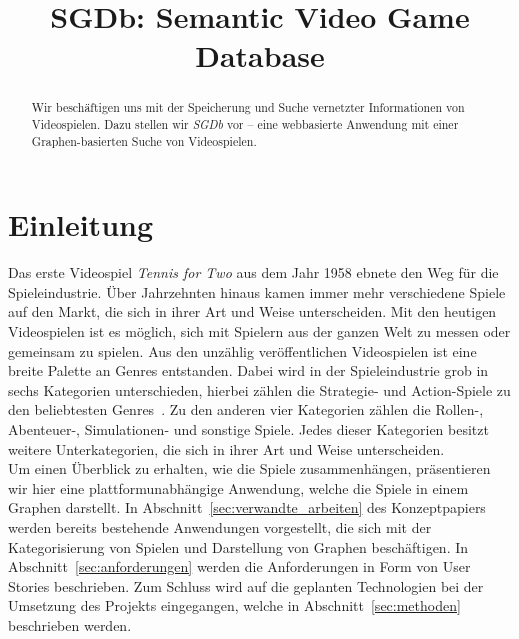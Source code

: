 \documentclass[a4paper, 10pt, conference]{IEEEtran}
\begin{document}
\title{\LARGE \bf
SGDb: Semantic Video Game Database
}

\author{
 \and
{} \and
{} \and
{} \and
{} \and
}

\maketitle
\thispagestyle{empty}
\pagestyle{empty}


\begin{abstract}
    Wir beschäftigen uns mit der Speicherung und Suche vernetzter Informationen von Videospielen.
    Dazu stellen wir \textit{SGDb} vor -- eine webbasierte Anwendung mit einer Graphen-basierten Suche von Videospielen.
\end{abstract}


\section{Einleitung}\label{sec:einleitung}

Das erste Videospiel \textit{Tennis for Two} aus dem Jahr 1958 ebnete den Weg für die Spieleindustrie. Über Jahrzehnten hinaus kamen immer mehr verschiedene Spiele auf den Markt, die sich in ihrer Art und Weise unterscheiden. Mit den heutigen Videospielen ist es möglich, sich mit Spielern aus der ganzen Welt zu messen oder gemeinsam zu spielen. Aus den unzählig veröffentlichen Videospielen ist eine breite Palette an Genres entstanden. Dabei wird in der Spieleindustrie grob in sechs Kategorien unterschieden, hierbei zählen die Strategie- und Action-Spiele zu den beliebtesten Genres~\cite{statistica}. Zu den anderen vier Kategorien zählen die Rollen-, Abenteuer-, Simulationen- und sonstige Spiele. Jedes dieser Kategorien besitzt weitere Unterkategorien, die sich in ihrer Art und Weise unterscheiden.\\

Um einen Überblick zu erhalten, wie die Spiele zusammenhängen, präsentieren wir hier eine plattformunabhängige Anwendung, welche die Spiele in einem Graphen darstellt. In Abschnitt~\ref{sec:verwandte_arbeiten} des Konzeptpapiers werden bereits bestehende Anwendungen vorgestellt, die sich mit der Kategorisierung von Spielen und Darstellung von Graphen beschäftigen.
In Abschnitt~\ref{sec:anforderungen} werden die Anforderungen in Form von User Stories beschrieben. Zum Schluss wird auf die geplanten Technologien bei der Umsetzung des Projekts eingegangen, welche in Abschnitt~\ref{sec:methoden} beschrieben werden.
\end{document}
